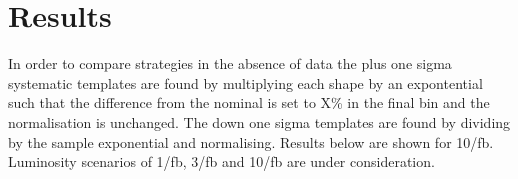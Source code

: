 %
%
%
\section{Results}

In order to compare strategies in the absence of data the plus one sigma systematic
templates are found by multiplying each shape by an expontential such that 
the difference from the nominal is set to X\% in the final bin 
and the normalisation is unchanged. The down one sigma templates are found by 
dividing by the sample exponential and normalising. Results below are shown
for 10/fb. Luminosity scenarios of 1/fb, 3/fb and 10/fb are under consideration.

